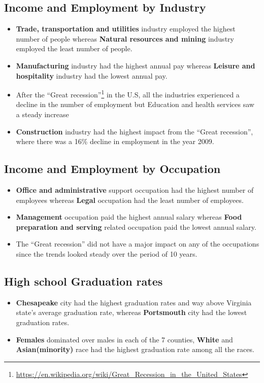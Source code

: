 \documentclass[12pt]{article}
\begin{document}
\subsection{Income and Employment by Industry}
\begin{itemize}

\item \textbf{Trade, transportation and utilities} industry employed the highest number of people whereas \textbf{Natural resources and mining} industry employed the least number of people. 
\item \textbf{Manufacturing} industry had the highest annual pay whereas \textbf{Leisure and hospitality} industry had the lowest annual pay.
\item After the ``Great recession''\footnote[6]{\url{https://en.wikipedia.org/wiki/Great_Recession_in_the_United_States}} in the U.S, all the industries experienced a decline in the number of employment but Education and health services saw a steady increase
\item \textbf{Construction} industry had the highest impact from the ``Great recession'', where there was a 16\% decline in employment in the year 2009.
\end{itemize}

\subsection{Income and Employment by Occupation}
\begin{itemize}

\item \textbf{Office and administrative} support occupation had the highest number of employees whereas \textbf{Legal} occupation had the least number of employees. 
\item \textbf{Management} occupation paid the highest annual salary whereas \textbf{Food preparation and serving} related occupation paid the lowest annual salary.
\item The ``Great recession'' did not have a major impact on any of the occupations since the trends looked steady over the period of 10 years.

\end{itemize}

\newpage

\subsection{High school Graduation rates}
\begin{itemize}

\item \textbf{Chesapeake} city had the highest graduation rates and way above Virginia state's average graduation rate, whereas \textbf{Portsmouth} city had the lowest graduation rates. 
\item \textbf{Females} dominated over males in each of the 7 counties, \textbf{White} and \textbf{Asian(minority)} race had the highest graduation rate among all the races.

\end{itemize}
\end{document}
